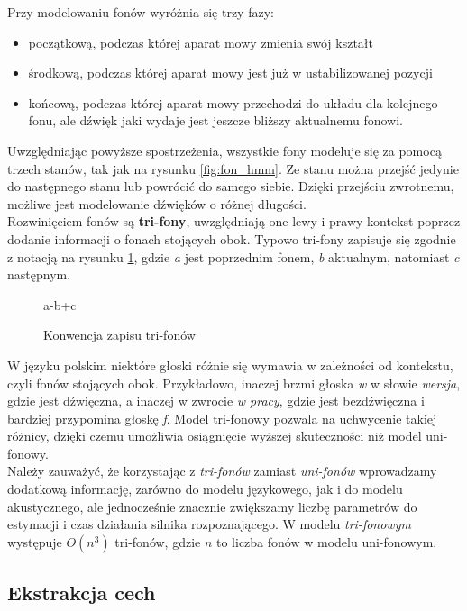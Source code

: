 \documentclass[11pt]{article}
\begin{document}
		Przy modelowaniu fonów wyróżnia się trzy fazy:
		\begin{itemize}
			\item początkową, podczas której aparat mowy zmienia swój kształt
			\item środkową, podczas której aparat mowy jest już w ustabilizowanej pozycji
			\item końcową, podczas której aparat mowy przechodzi do układu dla kolejnego fonu, ale dźwięk jaki wydaje jest jeszcze bliższy aktualnemu fonowi. 
		\end{itemize}
		Uwzględniając powyższe spostrzeżenia, wszystkie fony modeluje się za pomocą trzech stanów, tak jak na rysunku \ref{fig:fon_hmm}. Ze stanu można przejść jedynie do następnego stanu lub powrócić do samego siebie. Dzięki przejściu zwrotnemu, możliwe jest modelowanie dźwięków o różnej długości. 
		\\
		Rozwinięciem fonów są \textbf{tri-fony}, uwzględniają one lewy i prawy kontekst poprzez dodanie informacji o fonach stojących obok. Typowo tri-fony zapisuje się zgodnie z notacją na rysunku \ref{fig:tri-fony_notacja}, gdzie \textit{a} jest poprzednim fonem, \textit{b} aktualnym, natomiast \textit{c} następnym. 
		
		\begin{figure}[H]
			\begin{center}
			{a-b+c}
			\end{center}
			\caption{Konwencja zapisu tri-fonów}
			\label{fig:tri-fony_notacja}
		\end{figure}
	
		W języku polskim niektóre głoski różnie się wymawia w zależności od kontekstu, czyli fonów stojących obok. Przykładowo, inaczej brzmi głoska \textit{w} w słowie \textit{wersja}, gdzie jest dźwięczna, a inaczej w zwrocie \textit{w pracy}, gdzie jest bezdźwięczna i bardziej przypomina głoskę \textit{f}. Model tri-fonowy pozwala na uchwycenie takiej różnicy, dzięki czemu umożliwia osiągnięcie wyższej skuteczności niż model uni-fonowy.
		\\
		Należy zauważyć, że korzystając z \textit{tri-fonów} zamiast \textit{uni-fonów} wprowadzamy dodatkową informację, zarówno do modelu językowego, jak i do modelu akustycznego, ale jednocześnie znacznie zwiększamy liczbę parametrów do estymacji i czas działania silnika rozpoznającego. W modelu \textit{tri-fonowym} występuje $O(n^3)$ tri-fonów, gdzie $n$ to liczba fonów w modelu uni-fonowym.  
		
	\subsection{ Ekstrakcja cech }
\end{document}
